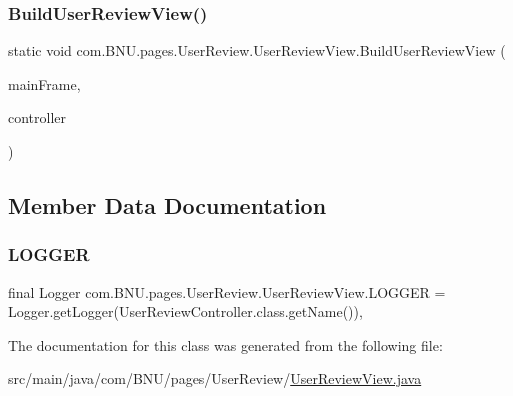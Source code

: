 \subsubsection{\texorpdfstring{Build\+User\+Review\+View()}{BuildUserReviewView()}}
{\footnotesize\ttfamily static void com.\+B\+N\+U.\+pages.\+User\+Review.\+User\+Review\+View.\+Build\+User\+Review\+View (\begin{DoxyParamCaption}\item[{J\+Frame}]{main\+Frame,  }\item[{\mbox{\hyperlink{classcom_1_1_b_n_u_1_1pages_1_1_user_review_1_1_user_review_controller}{User\+Review\+Controller}}}]{controller }\end{DoxyParamCaption})\hspace{0.3cm}{\ttfamily [static]}}



\subsection{Member Data Documentation}
\mbox{\label{classcom_1_1_b_n_u_1_1pages_1_1_user_review_1_1_user_review_view_a7d9c66fa9de93bfa310b711d8996dd5d}} 
\subsubsection{\texorpdfstring{L\+O\+G\+G\+ER}{LOGGER}}
{\footnotesize\ttfamily final Logger com.\+B\+N\+U.\+pages.\+User\+Review.\+User\+Review\+View.\+L\+O\+G\+G\+ER = Logger.\+get\+Logger(User\+Review\+Controller.\+class.\+get\+Name())\hspace{0.3cm}{\ttfamily [static]}, {\ttfamily [private]}}



The documentation for this class was generated from the following file\+:\begin{DoxyCompactItemize}
\item 
src/main/java/com/\+B\+N\+U/pages/\+User\+Review/\mbox{\hyperlink{_user_review_view_8java}{User\+Review\+View.\+java}}\end{DoxyCompactItemize}

